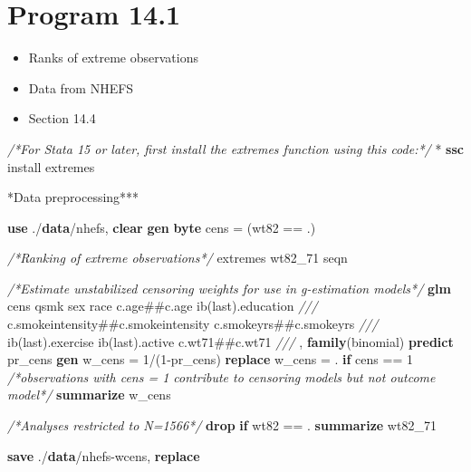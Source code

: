 \documentclass[
  10pt,
]{book}
\newenvironment{Shaded}{\begin{snugshade}}{\end{snugshade}}
\newcommand{\CommentTok}[1]{\textcolor[rgb]{0.56,0.35,0.01}{\textit{#1}}}
\newcommand{\FunctionTok}[1]{\textcolor[rgb]{0.00,0.00,0.00}{#1}}
\newcommand{\KeywordTok}[1]{\textcolor[rgb]{0.13,0.29,0.53}{\textbf{#1}}}
\newcommand{\NormalTok}[1]{#1}
\providecommand{\tightlist}{%
  \setlength{\itemsep}{0pt}\setlength{\parskip}{0pt}}
\begin{document}
\hypertarget{program-14.1}{%
\section{Program 14.1}\label{program-14.1}}

\begin{itemize}
\tightlist
\item
  Ranks of extreme observations
\item
  Data from NHEFS
\item
  Section 14.4
\end{itemize}

\begin{Shaded}
\begin{Highlighting}[]
\CommentTok{/*For Stata 15 or later, first install the extremes function using this code:*/}
\NormalTok{* }\KeywordTok{ssc}\NormalTok{ install extremes }

\NormalTok{*Data preprocessing***}

\KeywordTok{use}\NormalTok{ ./}\KeywordTok{data}\NormalTok{/nhefs, }\KeywordTok{clear}
\KeywordTok{gen} \KeywordTok{byte}\NormalTok{ cens = (wt82 == .)}

\CommentTok{/*Ranking of extreme observations*/}
\NormalTok{extremes wt82_71 seqn}

\CommentTok{/*Estimate unstabilized censoring weights for use in g-estimation models*/}
\KeywordTok{glm}\NormalTok{ cens qsmk sex race c.age##c.age ib(}\FunctionTok{last}\NormalTok{).education }\CommentTok{///}
\NormalTok{  c.smokeintensity##c.smokeintensity c.smokeyrs##c.smokeyrs }\CommentTok{///}
\NormalTok{  ib(}\FunctionTok{last}\NormalTok{).exercise ib(}\FunctionTok{last}\NormalTok{).active c.wt71##c.wt71 }\CommentTok{///}
\NormalTok{  , }\KeywordTok{family}\NormalTok{(binomial)}
\KeywordTok{predict}\NormalTok{ pr_cens}
\KeywordTok{gen}\NormalTok{ w_cens = 1/(1-pr_cens)}
\KeywordTok{replace}\NormalTok{ w_cens = . }\KeywordTok{if}\NormalTok{ cens == 1 }\CommentTok{/*observations with cens = 1 contribute to censoring models but not outcome model*/}
\KeywordTok{summarize}\NormalTok{ w_cens}

\CommentTok{/*Analyses restricted to N=1566*/}
\KeywordTok{drop} \KeywordTok{if}\NormalTok{ wt82 == .}
\KeywordTok{summarize}\NormalTok{ wt82_71}

\KeywordTok{save}\NormalTok{ ./}\KeywordTok{data}\NormalTok{/nhefs-wcens, }\KeywordTok{replace}
\end{Highlighting}
\end{Shaded}
\end{document}
